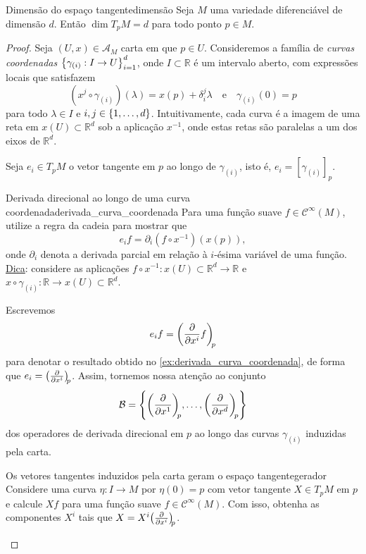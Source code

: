 \documentclass[12pt,a4paper]{article}
\numberwithin{equation}{section}
\DeclarePairedDelimiter\set{\{}{\}}
\newcommand\smooth[1]{\ensuremath{\mathcal{C}^\infty(#1)}}
\newcommand\ffamily[3]{\ensuremath{\set*{#1}_{#2}^{#3}}}
\newcommand\bvec[3][]{\ensuremath{\diffp*{#1}{#2}[#3]}}
\newcommand\bset[3]{\ensuremath{\set*{\diffp*{}{{#1}^1}[#3], \dots, \diffp*{}{{#1}^{#2}}[#3]}}}
\begin{document}
\begin{theorem}{Dimensão do espaço tangente}{dimensão}
    Seja \(M\) uma variedade diferenciável de dimensão \(d\). Então \(\dim{T_pM} = d\) para todo ponto \(p \in M\).
\end{theorem}
\begin{proof}
    Seja \((U, x) \in \mathscr{A}_M\) carta em que \(p \in U\). Consideremos a família de \emph{curvas coordenadas} \ffamily{\gamma_{(i)} : I \to U}{i=1}{d}, onde \(I \subset \mathbb{R}\) é um intervalo aberto, com expressões locais que satisfazem
    \begin{equation*}
        (x^j \circ \gamma_{(i)})(\lambda) = x(p) + \delta^j_i \lambda\quad\text{e}\quad \gamma_{(i)}(0) = p
    \end{equation*}
    para todo \(\lambda \in I\) e \(i, j \in \set{1,\dots,d}\). Intuitivamente, cada curva é a imagem de uma reta em \(x(U) \subset \mathbb{R}^d\) sob a aplicação \(x^{-1}\), onde estas retas são paralelas a um dos eixos de \(\mathbb{R}^d\).

    Seja \(e_i \in T_pM\) o vetor tangente em \(p\) ao longo de \(\gamma_{(i)}\), isto é, \(e_i = [\gamma_{(i)}]_p\).
    \begin{exercício}{Derivada direcional ao longo de uma curva coordenada}{derivada_curva_coordenada}
        Para uma função suave \(f \in \smooth{M}\), utilize a regra da cadeia para mostrar que
        \begin{equation*}
            e_i f = \partial_i(f \circ x^{-1})(x(p)),
        \end{equation*}
        onde \(\partial_i\) denota a derivada parcial em relação à \(i\)-ésima variável de uma função. \underline{Dica}: considere as aplicações \(f \circ x^{-1} : x(U) \subset \mathbb{R}^d \to \mathbb{R}\) e \(x \circ \gamma_{(i)} : \mathbb{R} \to x(U) \subset \mathbb{R}^d\).
    \end{exercício}
    Escrevemos
    \begin{equation*}
        e_i f = \bvec[f]{x^i}{p}
    \end{equation*}
    para denotar o resultado obtido no \cref{ex:derivada_curva_coordenada}, de forma que \(e_i = \bvec{x^i}{p}\). Assim, tornemos nossa atenção ao conjunto
    \begin{equation*}
        \mathcal{B} = \bset{x}{d}{p}
    \end{equation*}
    dos operadores de derivada direcional em \(p\) ao longo das curvas \(\gamma_{(i)}\) induzidas pela carta.

    \begin{exercício}{Os vetores tangentes induzidos pela carta geram o espaço tangente}{gerador}
        Considere uma curva \(\eta : I \to M\) por \(\eta(0) = p\) com vetor tangente \(X \in T_pM\) em \(p\) e calcule \(Xf\) para uma função suave \(f \in \smooth{M}\). Com isso, obtenha as componentes \(X^i\) tais que \(X = X^i\bvec{x^i}{p}\).
    \end{exercício}


\end{proof}
\end{document}
